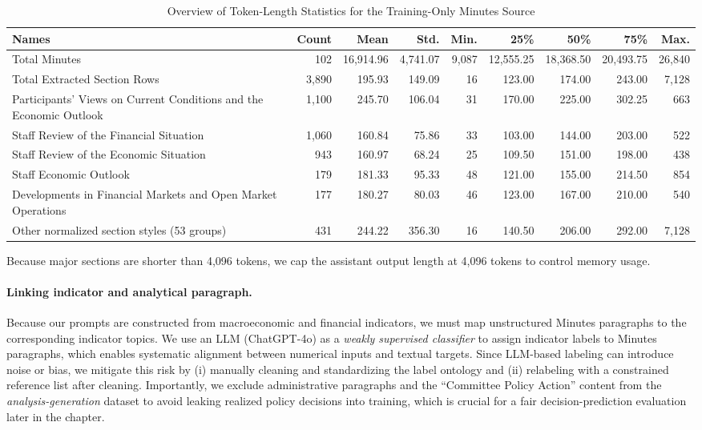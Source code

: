 \begin{table}[htbp]
    \scriptsize
    \centering
    \setlength{\tabcolsep}{2pt}
    \begin{tabular}{p{5.3cm}rrrrrrrr}
        \toprule
        Names & Count & Mean & Std. & Min. & 25\% & 50\% & 75\% & Max. \\
        \midrule
        Total Minutes
        & 102 & 16,914.96 & 4,741.07 & 9,087 & 12,555.25 & 18,368.50 & 20,493.75 & 26,840 \\
        \addlinespace[2pt]
        Total Extracted Section Rows
        & 3,890 & 195.93 & 149.09 & 16 & 123.00 & 174.00 & 243.00 & 7,128 \\
        \quad Participants' Views on Current Conditions and the Economic Outlook
        & 1,100 & 245.70 & 106.04 & 31 & 170.00 & 225.00 & 302.25 & 663 \\
        \quad Staff Review of the Financial Situation
        & 1,060 & 160.84 & 75.86 & 33 & 103.00 & 144.00 & 203.00 & 522 \\
        \quad Staff Review of the Economic Situation
        & 943 & 160.97 & 68.24 & 25 & 109.50 & 151.00 & 198.00 & 438 \\
        \quad Staff Economic Outlook
        & 179 & 181.33 & 95.33 & 48 & 121.00 & 155.00 & 214.50 & 854 \\
        \quad Developments in Financial Markets and Open Market Operations
        & 177 & 180.27 & 80.03 & 46 & 123.00 & 167.00 & 210.00 & 540 \\
        \quad Other normalized section styles (53 groups)
        & 431 & 244.22 & 356.30 & 16 & 140.50 & 206.00 & 292.00 & 7,128 \\
        \bottomrule
    \end{tabular}
    \caption{Overview of Token-Length Statistics for the Training-Only Minutes Source}
    \label{tab:ch2:summary_statis}
\end{table}


Because major sections are shorter than 4,096 tokens, we cap the assistant output length at 4,096 tokens to control memory usage.




\paragraph*{Linking indicator and analytical paragraph.}

Because our prompts are constructed from macroeconomic and financial indicators, we must map unstructured Minutes paragraphs to the corresponding indicator topics. We use an LLM (ChatGPT-4o) as a \textit{weakly supervised classifier} to assign indicator labels to Minutes paragraphs, which enables systematic alignment between numerical inputs and textual targets. Since LLM-based labeling can introduce noise or bias, we mitigate this risk by (i) manually cleaning and standardizing the label ontology and (ii) relabeling with a constrained reference list after cleaning. Importantly, we exclude administrative paragraphs and the ``Committee Policy Action'' content from the \textit{analysis-generation} dataset to avoid leaking realized policy decisions into training, which is crucial for a fair decision-prediction evaluation later in the chapter.


